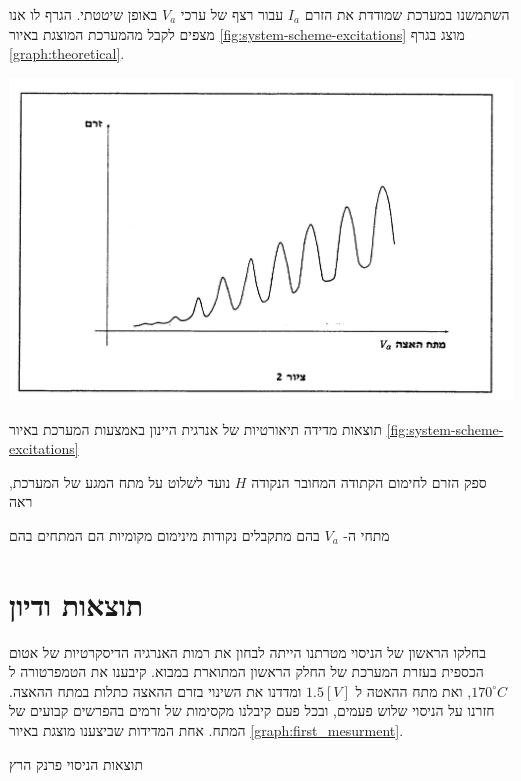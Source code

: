 \documentclass{article}
\begin{document}
השתמשנו במערכת שמודדת את הזרם
$I_a$
עבור רצף של ערכי
$V_a$
באופן שיטטתי. הגרף לו אנו מצפים לקבל מהמערכת המוצגת באיור
\ref{fig:system-scheme-excitations}
מוצג בגרף
\ref{graph:theoretical}.

\begin{graph}
    \centering
    \includegraphics[width=\textwidth]{./theoretical-graph.png}
    \caption{
    תוצאות מדידה תיאורטיות של אנרגית היינון באמצעות המערכת באיור
    \ref{fig:system-scheme-excitations}
    }
    \label{graph:theoretical}
\end{graph}

ספק הזרם לחימום הקתודה המחובר הנקודה
$H$
נועד לשלוט על מתח המגע של המערכת, ראה


מתחי ה-
$V_a$
בהם מתקבלים נקודות מינימום מקומיות הם המתחים בהם 

\section{תוצאות ודיון}
בחלקו הראשון של הניסוי מטרתנו הייתה לבחון את רמות האנרגיה הדיסקרטיות של אטום הכספית בעזרת המערכת של החלק הראשון המתוארת במבוא.
קיבענו את הטמפרטורה ל
$170 ^{\circ} C$,
ואת מתח ההאטה ל
$1.5 [V]$
ומדדנו את השינוי בזרם ההאצה כתלות במתח ההאצה.
חזרנו על הניסוי שלוש פעמים, ובכל פעם קיבלנו מקסימות של זרמים בהפרשים קבועים של המתח.
אחת המדידות שביצענו מוצגת באיור
\ref{graph:first_mesurment}.
 
\begin{graph}[H]
	\begin{center}
	\resizebox{\textwidth}{!}{}
	\end{center}
	\caption{תוצאות הניסוי פרנק הרץ}
\label{graph:first_mesurment}
\end{graph}
\end{document}
